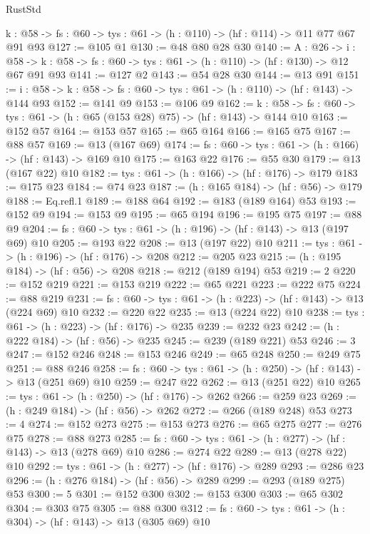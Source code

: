 \begin{lexlean}{RustStd}
\begin{coremodule}
{\begin{coremodule}
{{{{{{{  {k : @58} -> {fs : @60} -> {tys : @61} -> (h : @110) -> (hf : @114) -> @11 @77 @67 @91 @93
@127 := @105 @1
@130 := @48 @80 @28 @30
@140 := {A : @26} ->
  {i : @58} ->
  {k : @58} -> {fs : @60} -> {tys : @61} -> (h : @110) -> (hf : @130) -> @12 @67 @91 @93
@141 := @127 @2
@143 := @54 @28 @30
@144 := @13 @91
@151 := {i : @58} -> {k : @58} -> {fs : @60} -> {tys : @61} -> (h : @110) -> (hf : @143) -> @144 @93
@152 := @141 @9
@153 := @106 @9
@162 := {k : @58} ->
  {fs : @60} -> {tys : @61} -> (h : @65 (@153 @28) @75) -> (hf : @143) -> @144 @10
@163 := @152 @57
@164 := @153 @57
@165 := @65 @164
@166 := @165 @75
@167 := @88 @57
@169 := @13 (@167 @69)
@174 := {fs : @60} -> {tys : @61} -> (h : @166) -> (hf : @143) -> @169 @10
@175 := @163 @22
@176 := @55 @30
@179 := @13 (@167 @22) @10
@182 := {tys : @61} -> (h : @166) -> (hf : @176) -> @179
@183 := @175 @23
@184 := @74 @23
@187 := (h : @165 @184) -> (hf : @56) -> @179
@188 := Eq.refl.{1}
@189 := @188 @64
@192 := @183 (@189 @164) @53
@193 := @152 @9
@194 := @153 @9
@195 := @65 @194
@196 := @195 @75
@197 := @88 @9
@204 := {fs : @60} -> {tys : @61} -> (h : @196) -> (hf : @143) -> @13 (@197 @69) @10
@205 := @193 @22
@208 := @13 (@197 @22) @10
@211 := {tys : @61} -> (h : @196) -> (hf : @176) -> @208
@212 := @205 @23
@215 := (h : @195 @184) -> (hf : @56) -> @208
@218 := @212 (@189 @194) @53
@219 := 2
@220 := @152 @219
@221 := @153 @219
@222 := @65 @221
@223 := @222 @75
@224 := @88 @219
@231 := {fs : @60} -> {tys : @61} -> (h : @223) -> (hf : @143) -> @13 (@224 @69) @10
@232 := @220 @22
@235 := @13 (@224 @22) @10
@238 := {tys : @61} -> (h : @223) -> (hf : @176) -> @235
@239 := @232 @23
@242 := (h : @222 @184) -> (hf : @56) -> @235
@245 := @239 (@189 @221) @53
@246 := 3
@247 := @152 @246
@248 := @153 @246
@249 := @65 @248
@250 := @249 @75
@251 := @88 @246
@258 := {fs : @60} -> {tys : @61} -> (h : @250) -> (hf : @143) -> @13 (@251 @69) @10
@259 := @247 @22
@262 := @13 (@251 @22) @10
@265 := {tys : @61} -> (h : @250) -> (hf : @176) -> @262
@266 := @259 @23
@269 := (h : @249 @184) -> (hf : @56) -> @262
@272 := @266 (@189 @248) @53
@273 := 4
@274 := @152 @273
@275 := @153 @273
@276 := @65 @275
@277 := @276 @75
@278 := @88 @273
@285 := {fs : @60} -> {tys : @61} -> (h : @277) -> (hf : @143) -> @13 (@278 @69) @10
@286 := @274 @22
@289 := @13 (@278 @22) @10
@292 := {tys : @61} -> (h : @277) -> (hf : @176) -> @289
@293 := @286 @23
@296 := (h : @276 @184) -> (hf : @56) -> @289
@299 := @293 (@189 @275) @53
@300 := 5
@301 := @152 @300
@302 := @153 @300
@303 := @65 @302
@304 := @303 @75
@305 := @88 @300
@312 := {fs : @60} -> {tys : @61} -> (h : @304) -> (hf : @143) -> @13 (@305 @69) @10
}}}}}}}
\end{coremodule}}
\end{coremodule}
\end{lexlean}

